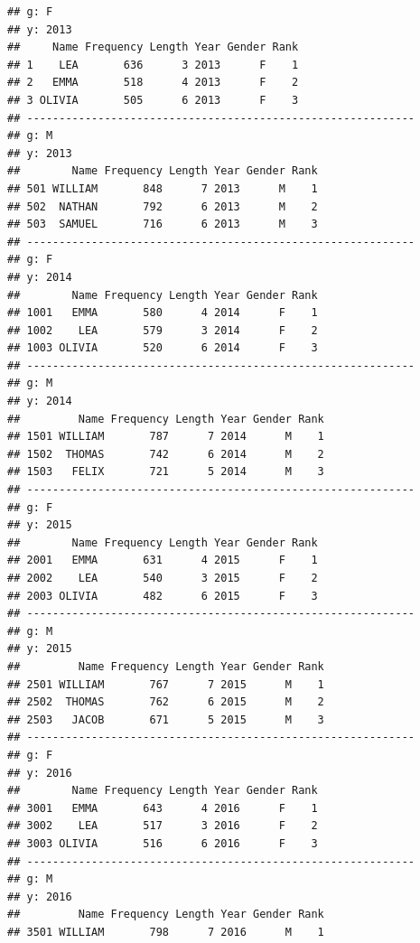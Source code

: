 \documentclass[]{book}
\newenvironment{Shaded}{\begin{snugshade}}{\end{snugshade}}
\newcommand{\DataTypeTok}[1]{\textcolor[rgb]{0.13,0.29,0.53}{#1}}
\newcommand{\DecValTok}[1]{\textcolor[rgb]{0.00,0.00,0.81}{#1}}
\newcommand{\KeywordTok}[1]{\textcolor[rgb]{0.13,0.29,0.53}{\textbf{#1}}}
\newcommand{\NormalTok}[1]{#1}
\newcommand{\OperatorTok}[1]{\textcolor[rgb]{0.81,0.36,0.00}{\textbf{#1}}}
\begin{document}
\begin{Shaded}
\end{Shaded}

\begin{verbatim}
## g: F
## y: 2013
##     Name Frequency Length Year Gender Rank
## 1    LEA       636      3 2013      F    1
## 2   EMMA       518      4 2013      F    2
## 3 OLIVIA       505      6 2013      F    3
## ------------------------------------------------------------ 
## g: M
## y: 2013
##        Name Frequency Length Year Gender Rank
## 501 WILLIAM       848      7 2013      M    1
## 502  NATHAN       792      6 2013      M    2
## 503  SAMUEL       716      6 2013      M    3
## ------------------------------------------------------------ 
## g: F
## y: 2014
##        Name Frequency Length Year Gender Rank
## 1001   EMMA       580      4 2014      F    1
## 1002    LEA       579      3 2014      F    2
## 1003 OLIVIA       520      6 2014      F    3
## ------------------------------------------------------------ 
## g: M
## y: 2014
##         Name Frequency Length Year Gender Rank
## 1501 WILLIAM       787      7 2014      M    1
## 1502  THOMAS       742      6 2014      M    2
## 1503   FELIX       721      5 2014      M    3
## ------------------------------------------------------------ 
## g: F
## y: 2015
##        Name Frequency Length Year Gender Rank
## 2001   EMMA       631      4 2015      F    1
## 2002    LEA       540      3 2015      F    2
## 2003 OLIVIA       482      6 2015      F    3
## ------------------------------------------------------------ 
## g: M
## y: 2015
##         Name Frequency Length Year Gender Rank
## 2501 WILLIAM       767      7 2015      M    1
## 2502  THOMAS       762      6 2015      M    2
## 2503   JACOB       671      5 2015      M    3
## ------------------------------------------------------------ 
## g: F
## y: 2016
##        Name Frequency Length Year Gender Rank
## 3001   EMMA       643      4 2016      F    1
## 3002    LEA       517      3 2016      F    2
## 3003 OLIVIA       516      6 2016      F    3
## ------------------------------------------------------------ 
## g: M
## y: 2016
##         Name Frequency Length Year Gender Rank
## 3501 WILLIAM       798      7 2016      M    1

\end{verbatim}
\end{document}
